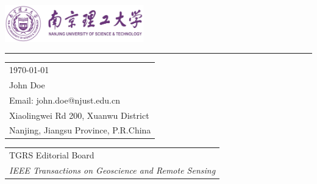 \documentclass{article}
\begin{document}

\includegraphics[width=0.45\textwidth]{njust.png} %

\vspace{-1em} %

\rule{\linewidth}{1pt} %

\bigskip\bigskip %


\hfill
\begin{tabular}{l @{}}
\hfill \today \bigskip\\ %
\hfill John Doe \\
\hfill Email: john.doe@njust.edu.cn \\
\hfill Xiaolingwei Rd 200, Xuanwu District\\
\hfill Nanjing, Jiangsu Province, P.R.China \\ %
\end{tabular}


\bigskip %


% 
% 
\begin{tabular}{@{} l}
	TGRS Editorial Board \\
	\textit{IEEE Transactions on Geoscience and Remote Sensing}
\end{tabular}

\bigskip %
\end{document}
